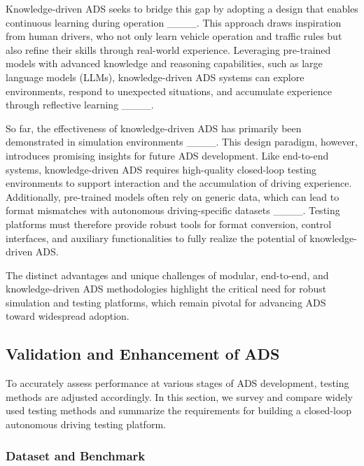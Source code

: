 Knowledge-driven ADS seeks to bridge this gap by adopting a design that enables continuous learning during operation ____. This approach draws inspiration from human drivers, who not only learn vehicle operation and traffic rules but also refine their skills through real-world experience. Leveraging pre-trained models with advanced knowledge and reasoning capabilities, such as large language models (LLMs), knowledge-driven ADS systems can explore environments, respond to unexpected situations, and accumulate experience through reflective learning ____.

So far, the effectiveness of knowledge-driven ADS has primarily been demonstrated in simulation environments ____. This design paradigm, however, introduces promising insights for future ADS development. Like end-to-end systems, knowledge-driven ADS requires high-quality closed-loop testing environments to support interaction and the accumulation of driving experience. Additionally, pre-trained models often rely on generic data, which can lead to format mismatches with autonomous driving-specific datasets ____. Testing platforms must therefore provide robust tools for format conversion, control interfaces, and auxiliary functionalities to fully realize the potential of knowledge-driven ADS.

The distinct advantages and unique challenges of modular, end-to-end, and knowledge-driven ADS methodologies highlight the critical need for robust simulation and testing platforms, which remain pivotal for advancing ADS toward widespread adoption.

\subsection{Validation and Enhancement of ADS}

To accurately assess performance at various stages of ADS development, testing methods are adjusted accordingly. In this section, we survey and compare widely used testing methods and summarize the requirements for building a closed-loop autonomous driving testing platform.

\subsubsection{Dataset and Benchmark}


